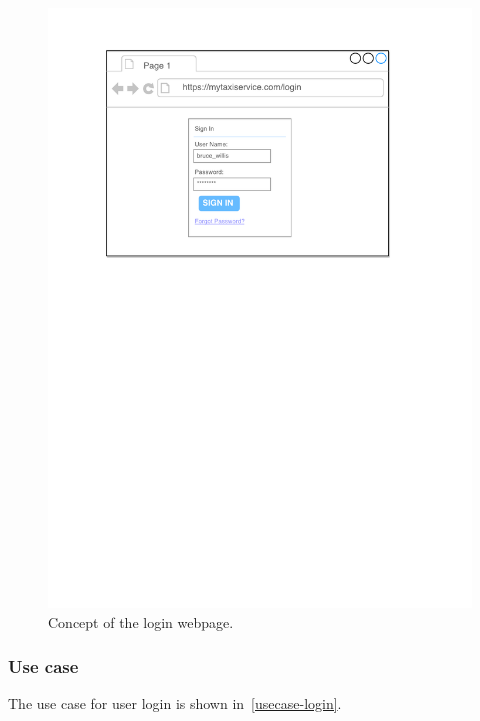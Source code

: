 \begin{figure}
\includegraphics[width=\textwidth]{mockup/Login_browser.pdf}
\caption{Concept of the login webpage.}
\label{fig:mockup-login}
\end{figure}



\subsubsection{Use case}
The use case for user login is shown in~\autoref{usecase-login}.

